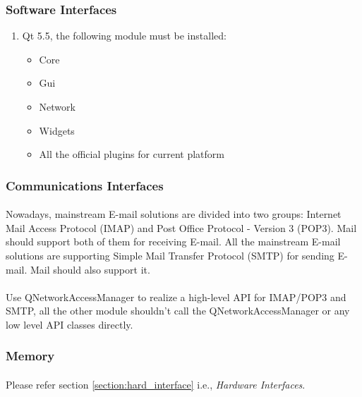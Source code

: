 \documentclass[11pt,a4paper]{article}
\begin{document}
            \subsubsection{Software Interfaces}\label{section:soft_interface}
                \begin{enumerate}
                    \item {Qt 5.5, the following module must be installed:
                        \begin{itemize}
                            \item Core
                            \item Gui
                            \item Network
                            \item Widgets
                            \item All the official plugins for current platform
                        \end{itemize}}
                \end{enumerate}
            \subsubsection{Communications Interfaces}
                \paragraph{} Nowadays, mainstream E-mail solutions are divided into two groups: Internet Mail Access Protocol (IMAP) and Post Office Protocol - Version 3 (POP3). Mail should support both of them for receiving E-mail. All the mainstream E-mail solutions are supporting Simple Mail Transfer Protocol (SMTP) for sending E-mail. Mail should also support it.
                \paragraph{} Use QNetworkAccessManager to realize a high-level API for IMAP/POP3 and SMTP, all the other module shouldn't call the QNetworkAccessManager or any low level API classes directly.
            \subsubsection{Memory}
                \paragraph{} Please refer section \ref{section:hard_interface} i.e., \emph{Hardware Interfaces}.
\end{document}
